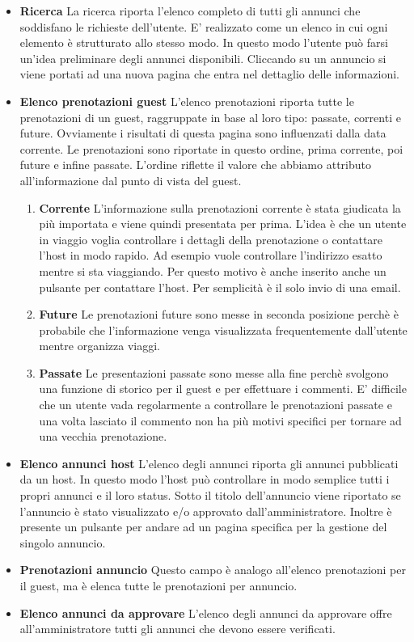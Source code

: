 \documentclass[1_relazione.tex]{subfiles}
\begin{document}
\begin{itemize}
\item \textbf{Ricerca}
La ricerca riporta l'elenco completo di tutti gli annunci che soddisfano le richieste dell'utente. E' realizzato come un elenco in cui ogni elemento \`{e} strutturato allo stesso modo. In questo modo l'utente pu\`{o} farsi un'idea preliminare degli annunci disponibili. Cliccando su un annuncio si viene portati ad una nuova pagina che entra nel dettaglio delle informazioni.

\item\textbf{Elenco prenotazioni guest}
L'elenco prenotazioni riporta tutte le prenotazioni di un guest, raggruppate in base al loro tipo: passate, correnti e future. Ovviamente i risultati di questa pagina sono influenzati dalla data corrente. Le prenotazioni sono riportate in questo ordine, prima corrente, poi future e infine passate. L'ordine riflette il valore che abbiamo attributo all'informazione dal punto di vista del guest.
\begin{enumerate}
\item \textbf{Corrente} L'informazione sulla prenotazioni corrente \`{e} stata giudicata la pi\`{u} importata e viene quindi presentata per prima. L'idea \`{e} che un utente in viaggio voglia controllare i dettagli della prenotazione o contattare l'host in modo rapido. Ad esempio vuole controllare l'indirizzo esatto mentre si sta viaggiando. Per questo motivo \`{e} anche inserito anche un pulsante per contattare l'host. Per semplicit\`{a} \`{e} il solo invio di una email.
\item \textbf{Future} Le prenotazioni future sono messe in seconda posizione perch\`{e} \`{e} probabile che l'informazione venga visualizzata frequentemente dall'utente mentre organizza viaggi.
\item \textbf{Passate} Le presentazioni passate sono messe alla fine perch\`{e} svolgono una funzione di storico per il guest e  per effettuare i commenti. E' difficile che un utente vada regolarmente a controllare le prenotazioni passate e una volta lasciato il commento non ha pi\`{u} motivi specifici per tornare ad una vecchia prenotazione.
\end{enumerate}

\item \textbf{Elenco annunci host}
L'elenco degli annunci riporta gli annunci pubblicati da un host. In questo modo l'host pu\`{o} controllare in modo semplice tutti i propri annunci e il loro status. Sotto il titolo dell'annuncio viene riportato se l'annuncio \`{e} stato visualizzato e/o approvato dall'amministratore. Inoltre \`{e} presente un pulsante per andare ad un pagina specifica per la gestione del singolo annuncio.

\item \textbf{Prenotazioni annuncio} Questo campo \`{e} analogo all'elenco prenotazioni per il guest, ma \`{e} elenca tutte le prenotazioni per annuncio.

\item \textbf{Elenco annunci da approvare}
L'elenco degli annunci da approvare offre all'amministratore tutti gli annunci che devono essere verificati. 

\end{itemize}
\end{document}
